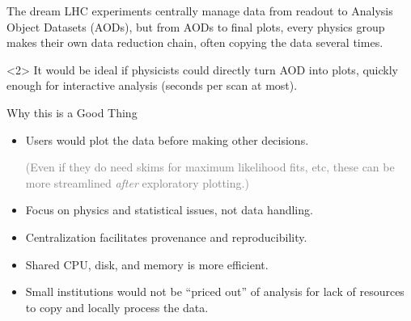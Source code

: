 \documentclass{beamer}
\begin{document}
\begin{frame}{The dream}
\vspace{0.5 cm}
LHC experiments centrally manage data from readout to Analysis Object Datasets (AODs), but from AODs to final plots, every physics group makes their own data reduction chain, often copying the data several times.

\vspace{0.2 cm}

\vspace{0.5 cm}
\begin{uncoverenv}<2>
It would be ideal if physicists could directly turn AOD into plots, quickly enough for interactive analysis (seconds per scan at most).
\end{uncoverenv}
\end{frame}

\begin{frame}{Why this is a Good Thing}
\large
\vspace{0.5 cm}
\begin{itemize}\setlength{\itemsep}{0.5 cm}
\item Users would plot the data before making other decisions.

\vspace{0.2 cm}
\textcolor{gray}{\normalsize (Even if they do need skims for maximum likelihood fits, etc, these can be more streamlined {\it after} exploratory plotting.)}

\vspace{-0.2 cm}
\item Focus on physics and statistical issues, not data handling.
\item Centralization facilitates provenance and reproducibility.
\item Shared CPU, disk, and memory is more efficient.
\item Small institutions would not be ``priced out'' of analysis for lack of resources to copy and locally process the data.
\end{itemize}
\end{frame}
\end{document}
